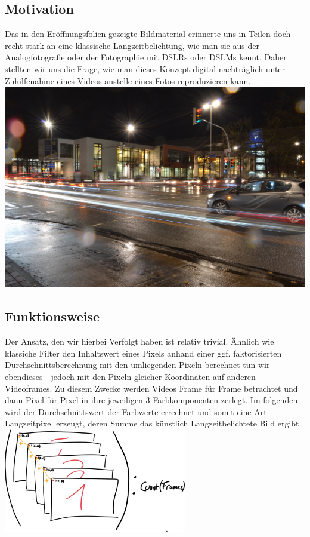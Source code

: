 \documentclass[12pt]{scrartcl}
\begin{document}
\subsection{Motivation}Das in den Er\"offnungsfolien gezeigte Bildmaterial erinnerte uns in Teilen doch recht stark an eine klassische
Langzeitbelichtung, wie
man sie aus der Analogfotografie oder der Fotographie mit DSLRs oder DSLMs kennt. Daher stellten wir uns die Frage, wie man dieses Konzept digital nachtr\"aglich unter Zuhilfenahme eines Videos anstelle eines Fotos reproduzieren kann.\\
 \includegraphics[width=\textwidth]{media/lzb}\\
\subsection{Funktionsweise}Der Ansatz, den wir hierbei Verfolgt haben ist relativ trivial. \"Ahnlich wie klassiche Filter den
Inhaltswert eines Pixels anhand einer ggf. faktorisierten Durchschnittsberechnung mit den umliegenden Pixeln berechnet tun wir ebendieses - jedoch mit den Pixeln gleicher Koordinaten auf anderen Videoframes. Zu diesem Zwecke werden Videos Frame f\"ur Frame betrachtet und dann Pixel f\"ur Pixel in ihre jeweiligen 3 Farbkomponenten zerlegt. Im folgenden wird der Durchschnittswert der Farbwerte errechnet und somit eine Art Langzeitpixel erzeugt, deren Summe das k\"unstlich Langzeitbelichtete Bild ergibt.\\
\includegraphics[width=0.6\textwidth]{media/funclzb}
\end{document}
